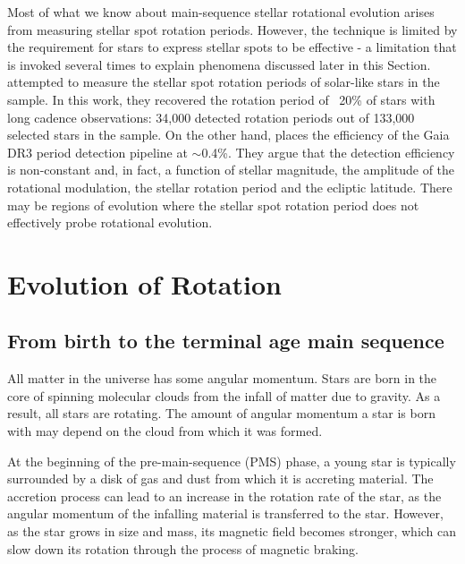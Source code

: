 Most of what we know about main-sequence stellar rotational evolution arises from measuring stellar spot rotation periods.
However, the technique is limited by the requirement for stars to express stellar spots to be effective - a limitation that is invoked several times to explain phenomena discussed later in this Section. 
\citet{mcquillan_rotation_2014} attempted to measure the stellar spot rotation periods of solar-like stars in the \kepler{} sample.
In this work, they recovered the rotation period of ~20\% of stars with long cadence observations: 34,000 detected rotation periods out of 133,000 selected stars in the sample.
On the other hand, \citet{distefano_gaia_2022} places the efficiency of the Gaia DR3 period detection pipeline at $\sim$0.4\%.
They argue that the detection efficiency is non-constant and, in fact, a function of stellar magnitude, the amplitude of the rotational modulation, the stellar rotation period and the ecliptic latitude.
There may be regions of evolution where the stellar spot rotation period does not effectively probe rotational evolution.


\section{Evolution of Rotation}
\label{sec:evolution}


\subsection{From birth to the terminal age main sequence}

All matter in the universe has some angular momentum. 
Stars are born in the core of spinning molecular clouds from the infall of matter due to gravity. 
As a result, all stars are rotating.
The amount of angular momentum a star is born with may depend on the cloud from which it was formed.

At the beginning of the pre-main-sequence (PMS) phase, a young star is typically surrounded by a disk of gas and dust from which it is accreting material.
The accretion process can lead to an increase in the rotation rate of the star, as the angular momentum of the infalling material is transferred to the star.
However, as the star grows in size and mass, its magnetic field becomes stronger, which can slow down its rotation through the process of magnetic braking.

